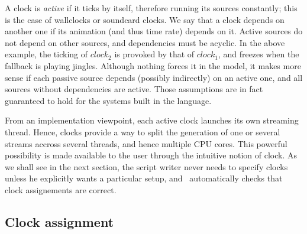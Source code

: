 A clock is \emph{active} if it ticks by itself,
therefore running its sources constantly; this
is the case of wallclocks or soundcard clocks.
We say that a clock depends on another one
if its animation (and thus time rate) depends on it.
Active sources do not depend on other sources,
and dependencies must be acyclic.
In the above example, the ticking of
$clock_2$ is provoked by that of
$clock_1$, and freezes when the fallback
is playing jingles.
Although nothing forces it in the model, it makes more sense if
each passive source depends (possibly indirectly) on an active one,
and all sources without dependencies are active.
Those assumptions are in fact guaranteed to hold for the systems
built in the \liquidsoap{} language.

From an implementation viewpoint, each active clock launches
its own streaming thread.
Hence, clocks provide a way to split the generation of one or
several streams accross several threads,
and hence multiple CPU cores.
This powerful possibility is made available to the user
through the intuitive notion of clock.
As we shall see in the next section,
the script writer never needs to specify clocks unless he
explicitly wants a particular setup,
and \liquidsoap\ automatically checks that clock assignements
are correct.


\subsection{Clock assignment}

